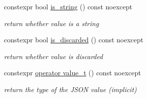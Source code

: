 \begin{DoxyCompactItemize}
constexpr bool \hyperlink{classnlohmann_1_1basic__json_a69b596a4a6683b362095c9a139637396}{is\+\_\+string} () const noexcept
\begin{DoxyCompactList}\small\item\em return whether value is a string \end{DoxyCompactList}\item 
constexpr bool \hyperlink{classnlohmann_1_1basic__json_aabe623bc8304c2ba92d96d91f390fab4}{is\+\_\+discarded} () const noexcept
\begin{DoxyCompactList}\small\item\em return whether value is discarded \end{DoxyCompactList}\item 
constexpr \hyperlink{classnlohmann_1_1basic__json_a26ef3058e249f82a04f8ec18f7419027}{operator value\+\_\+t} () const noexcept
\begin{DoxyCompactList}\small\item\em return the type of the J\+S\+ON value (implicit) \end{DoxyCompactList}\end{DoxyCompactItemize}
